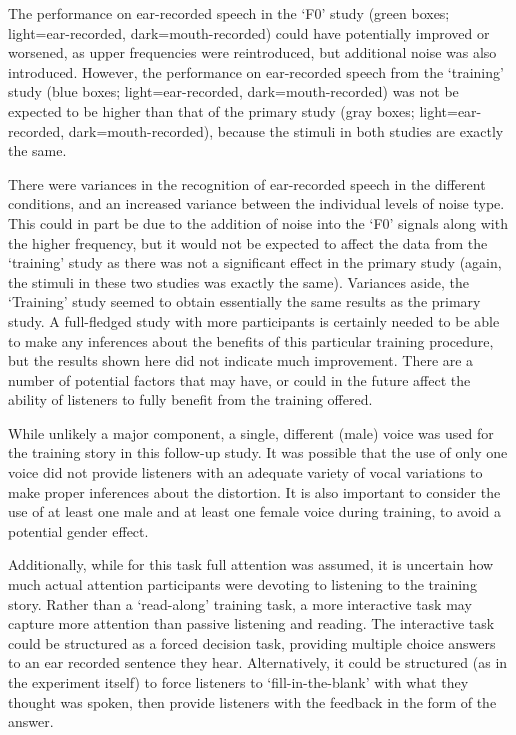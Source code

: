 The performance on ear-recorded speech in the `F0' study (green boxes; light=ear-recorded, dark=mouth-recorded) could have potentially improved or worsened, as upper frequencies were reintroduced, but additional noise was also introduced.  However, the performance on ear-recorded speech from the `training' study (blue boxes; light=ear-recorded, dark=mouth-recorded) was not be expected to be higher than that of the primary study (gray boxes; light=ear-recorded, dark=mouth-recorded), because the stimuli in both studies are exactly the same.  

There were variances in the recognition of ear-recorded speech in the different conditions, and an increased variance between the individual levels of noise type.  This could in part be due to the addition of noise into the `F0' signals along with the higher frequency, but it would not be expected to affect the data from the `training' study as there was not a significant effect in the primary study (again, the stimuli in these two studies was exactly the same).  Variances aside, the `Training' study seemed to obtain essentially the same results as the primary study.  A full-fledged study with more participants is certainly needed to be able to make any inferences about the benefits of this particular training procedure, but the results shown here did not indicate much improvement.  There are a number of potential factors that may have, or could in the future affect the ability of listeners to fully benefit from the training offered.  

While unlikely a major component, a single, different (male) voice was used for the training story in this follow-up study.  It was possible that the use of only one voice did not provide listeners with an adequate variety of vocal variations to make proper inferences about the distortion.  It is also important to consider the use of at least one male and at least one female voice during training, to avoid a potential gender effect.

Additionally, while for this task full attention was assumed, it is uncertain how much actual attention participants were devoting to listening to the training story.  Rather than a `read-along' training task, a more interactive task may capture more attention than passive listening and reading.  The interactive task could be structured as a forced decision task, providing multiple choice answers to an ear recorded sentence they hear.  Alternatively, it could be structured (as in the experiment itself) to force listeners to `fill-in-the-blank' with what they thought was spoken, then provide listeners with the feedback in the form of the answer.  

